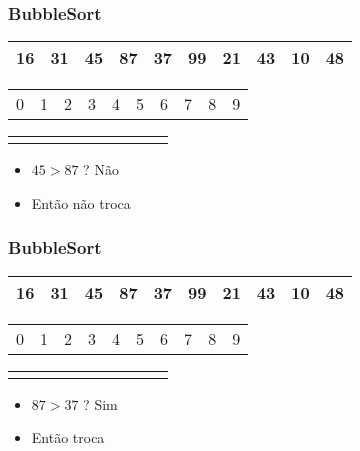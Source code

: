 \documentclass{beamer}
\begin{document}
\begin{frame}
    \frametitle{BubbleSort}
    \begin{center}
        \begin{table}
            \begin{tabular}{| p{0.25cm} | p{0.25cm} | p{0.25cm} | p{0.25cm} | p{0.25cm} | p{0.25cm} | p{0.25cm} | p{0.25cm} | p{0.25cm} | p{0.25cm} |}
                \hline
                16 & 31 & 45 & 87 & 37 & 99 & 21 & 43 & 10 & 48 \\ \hline
            \end{tabular}
            \begin{tabular}{p{0.25cm} p{0.25cm} p{0.25cm} p{0.25cm} p{0.25cm} p{0.25cm} p{0.25cm} p{0.25cm} p{0.25cm} p{0.25cm}}
                0 & 1 & 2 & 3 & 4 & 5 & 6 & 7 & 8 & 9
            \end{tabular}
            \begin{tabular}{p{0.25cm} p{0.25cm} p{0.25cm} p{0.25cm} p{0.25cm} p{0.25cm} p{0.25cm} p{0.25cm} p{0.25cm} p{0.25cm}}
                & & \color{red}{$\uparrow$} & \color{blue}{$\uparrow$} & & & & & &
            \end{tabular}
        \end{table}
	\end{center}
    \begin{itemize}[<+->]
        \item $45 > 87$ ? Não
        \item Então não troca
    \end{itemize}
\end{frame}

\begin{frame}
    \frametitle{BubbleSort}
    \begin{center}
        \begin{table}
            \begin{tabular}{| p{0.25cm} | p{0.25cm} | p{0.25cm} | p{0.25cm} | p{0.25cm} | p{0.25cm} | p{0.25cm} | p{0.25cm} | p{0.25cm} | p{0.25cm} |}
                \hline
                16 & 31 & 45 & 87 & 37 & 99 & 21 & 43 & 10 & 48 \\ \hline
            \end{tabular}
            \begin{tabular}{p{0.25cm} p{0.25cm} p{0.25cm} p{0.25cm} p{0.25cm} p{0.25cm} p{0.25cm} p{0.25cm} p{0.25cm} p{0.25cm}}
                0 & 1 & 2 & 3 & 4 & 5 & 6 & 7 & 8 & 9
            \end{tabular}
            \begin{tabular}{p{0.25cm} p{0.25cm} p{0.25cm} p{0.25cm} p{0.25cm} p{0.25cm} p{0.25cm} p{0.25cm} p{0.25cm} p{0.25cm}}
                & & & \color{blue}{$\uparrow$} & \color{red}{$\uparrow$} & & & & &
            \end{tabular}
        \end{table}
	\end{center}
    \begin{itemize}[<+->]
        \item $87 > 37$ ? Sim
        \item Então troca
    \end{itemize}
\end{frame}
\end{document}
